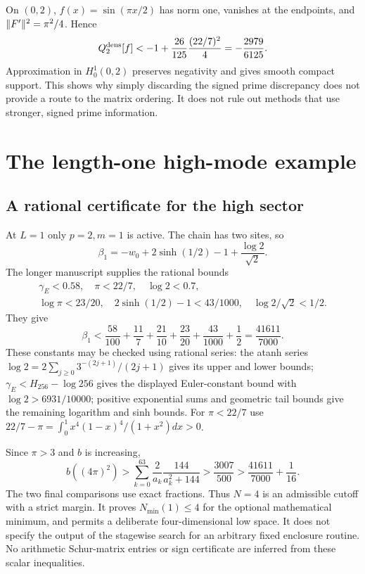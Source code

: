 On $(0,2)$, $f(x)=\sin(\pi x/2)$ has norm one, vanishes at the endpoints,
and $\lVert F'\rVert^2=\pi^2/4$. Hence
\[
Q_2^{\rm dens}[f]<-1+\frac{26}{125}\frac{(22/7)^2}{4}
=-\frac{2979}{6125}.
\]
Approximation in $H_0^1(0,2)$ preserves negativity and gives smooth compact
support. This shows why simply discarding the signed prime discrepancy
does not provide a route to the matrix ordering. It does not rule out
methods that use stronger, signed prime information.

\section{The length-one high-mode example}
\subsection{A rational certificate for the high sector}
At $L=1$ only $p=2,m=1$ is active. The chain has two sites, so
\[
\beta_1=-w_0+2\sinh(1/2)-1+\frac{\log2}{\sqrt2}.
\]
The longer manuscript supplies the rational bounds
\[
\begin{gathered}
\gamma_E<0.58,\quad\pi<22/7,\quad\log2<0.7,\\
\log\pi<23/20,\quad2\sinh(1/2)-1<43/1000,\quad
\log2/\sqrt2<1/2.
\end{gathered}
\]
They give
\[
\beta_1<\frac{58}{100}+\frac{11}{7}+\frac{21}{10}
+\frac{23}{20}+\frac{43}{1000}+\frac12=\frac{41611}{7000}.
\]
These constants may be checked using rational series: the atanh series
$\log2=2\sum_{j\ge0}3^{-(2j+1)}/(2j+1)$ gives its upper and lower bounds;
$\gamma_E<H_{256}-\log256$ gives the displayed Euler-constant bound
with $\log2>6931/10000$; positive exponential sums and geometric tail
bounds give the remaining logarithm and sinh bounds. For $\pi<22/7$ use
$22/7-\pi=\int_0^1x^4(1-x)^4/(1+x^2)dx>0$.

Since $\pi>3$ and $b$ is increasing,
\[
b((4\pi)^2)>\sum_{k=0}^{63}\frac2{a_k}\frac{144}{a_k^2+144}
>\frac{3007}{500}>\frac{41611}{7000}+\frac1{16}.
\]
The two final comparisons use exact fractions. Thus $N=4$ is an
admissible cutoff with a strict margin. It proves $N_{\min}(1)\le4$
for the optional mathematical minimum, and permits a deliberate
four-dimensional low space. It does not specify the output of the
stagewise search for an arbitrary fixed enclosure routine.
No arithmetic Schur-matrix entries or sign certificate are inferred
from these scalar inequalities.

